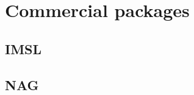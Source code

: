 





\section{Commercial packages}
\label{sec:commercial-packages-1}

\subsection{IMSL}
\label{sec:imsl-1}

\subsection{NAG}
\label{sec:nag-1}



